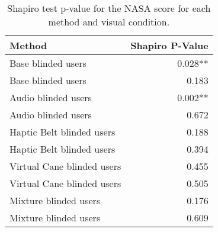 
\begin{table}[!htb]
\centering
\caption{Shapiro test p-value for the NASA score for each method and visual condition.}
\label{tab:shapiro_nasa_score}
\begin{tabular}{lr}
\toprule
                    Method & Shapiro P-Value \\
\midrule
        Base blinded users &         0.028** \\
        Base blinded users &           0.183 \\
       Audio blinded users &         0.002** \\
       Audio blinded users &           0.672 \\
 Haptic Belt blinded users &           0.188 \\
 Haptic Belt blinded users &           0.394 \\
Virtual Cane blinded users &           0.455 \\
Virtual Cane blinded users &           0.505 \\
     Mixture blinded users &           0.176 \\
     Mixture blinded users &           0.609 \\
\bottomrule
\end{tabular}
\end{table}

